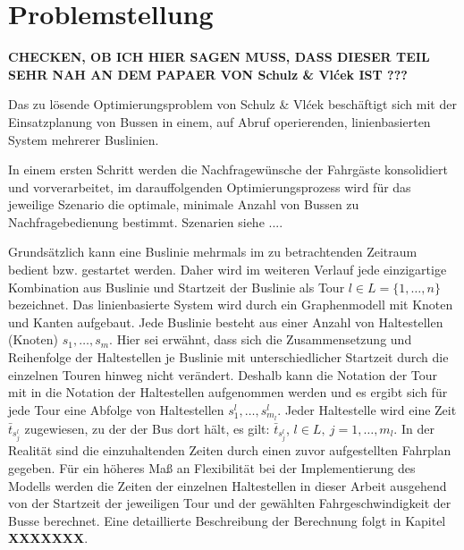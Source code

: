 \chapter{Problemstellung}
\label{chapter:3}
\label{chapter:Problemstellung}

\textbf{CHECKEN, OB ICH HIER SAGEN MUSS, DASS DIESER TEIL SEHR NAH AN DEM PAPAER VON Schulz \& Vlćek IST ???}

Das zu lösende Optimierungsproblem von Schulz \& Vlćek beschäftigt sich mit der Einsatzplanung von Bussen in einem, auf Abruf operierenden, linienbasierten System mehrerer Buslinien. 

In einem ersten Schritt werden die Nachfragewünsche der Fahrgäste konsolidiert und vorverarbeitet, im darauffolgenden Optimierungsprozess wird für das jeweilige Szenario die optimale, minimale Anzahl von Bussen zu Nachfragebedienung bestimmt. Szenarien siehe ....




Grundsätzlich kann eine Buslinie mehrmals im zu betrachtenden Zeitraum bedient bzw. gestartet werden. 
Daher wird im weiteren Verlauf jede einzigartige Kombination aus Buslinie und Startzeit der Buslinie als Tour \( l \in L = \{1,  \dots , n\} \) bezeichnet. 
Das linienbasierte System wird durch ein Graphenmodell mit Knoten und Kanten aufgebaut. Jede Buslinie besteht aus einer Anzahl von Haltestellen (Knoten) $s_1, \dots, s_{m}$. Hier sei erwähnt, dass sich die Zusammensetzung und Reihenfolge der Haltestellen je Buslinie mit unterschiedlicher Startzeit durch die einzelnen Touren hinweg nicht verändert. Deshalb kann die Notation der Tour mit in die Notation der Haltestellen aufgenommen werden und es ergibt sich für jede Tour eine Abfolge von Haltestellen $s^l_1,  \dots , s^l_{m_l}$.
Jeder Haltestelle wird eine Zeit $\bar{t}_{s^l_j}$ zugewiesen, zu der der Bus dort hält, es gilt: $\bar{t}_{s^l_j}$, $l \in L,\ j = 1, \dots, m_l$.
In der Realität sind die einzuhaltenden Zeiten durch einen zuvor aufgestellten Fahrplan gegeben. Für ein höheres Maß an Flexibilität bei der Implementierung des Modells werden die Zeiten der einzelnen Haltestellen in dieser Arbeit ausgehend von der Startzeit der jeweiligen Tour und der gewählten Fahrgeschwindigkeit der Busse berechnet. Eine detaillierte Beschreibung der Berechnung folgt in Kapitel \textbf{XXXXXXX}.



